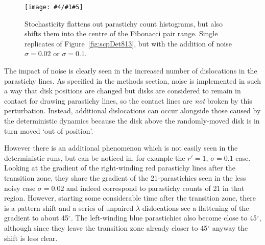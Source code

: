 \documentclass[a4paper,10pt]{amsart}
\newlength{\jfigwidth}
\newcommand{\pdffig}[3]{\jdofig{#1}{#2}{#3}{Figures}{.pdf}}
\newcommand{\jdofig}[5]{
	\begin{figure}\centering\texttt{[image: \#4/\#1\#5]} \caption{#2}\label{fig:#1}\end{figure}
}
\begin{document}
\pdffig{scpSch813}{Stochasticity flattens out parastichy count histograms, but also shifts them into the centre of the Fibonacci pair range. Single replicates of Figure~\ref{fig:scpDet813},  but with the addition of noise $\sigma=0.02$ or $\sigma=0.1$.} {.8}

The impact of noise is clearly seen in the increased number of dislocations in the parastichy lines. As specified in the methods section,  noise is implemented in such a way that disk positions are changed but disks are considered to remain in contact for drawing parastichy lines, so the contact lines are \textit{not} broken by this perturbation. Instead, additional dislocations can occur alongside those caused by the deterministic dynamics because the disk above the randomly-moved disk is in turn moved `out of position'. 

However there is an additional phenomenon which is not easily seen in the deterministic runs, but can be noticed in, for example the $r'=1$, $\sigma=0.1$ case. Looking at the gradient of the right-winding red parastichy lines after the transition zone, they share the gradient of the 21-parastichies seen in the less noisy case $\sigma=0.02$ and indeed correspond to parastichy counts of 21 in that region. However, starting some considerable time after the transition zone, there is a pattern shift and a series of unpaired $\lambda$ dislocations see a flattening of the gradient to about 45$^\circ$. The left-winding blue parastichies  also  become close to 45$^\circ$, although since they leave the transition zone already closer to 45$^\circ$ anyway the shift is less clear. 
\end{document}
